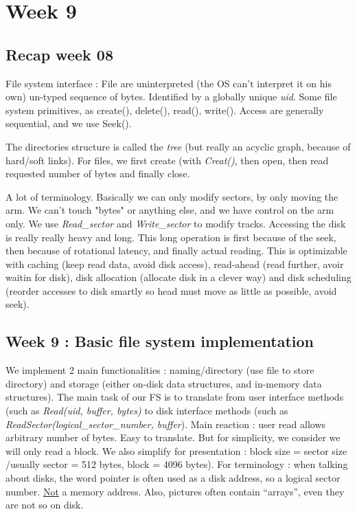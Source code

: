 \documentclass[12pt,a4paper]{article}
\begin{document}
\section{Week 9}
\subsection{Recap week 08}
File system interface : File are uninterpreted (the OS can't interpret it on his own) un-typed sequence of bytes. Identified by a globally unique \textit{uid}. Some file system primitives, as create(), delete(), read(), write(). Access are generally sequential, and we use Seek(). 

The directories structure is called the \textit{tree} (but really an acyclic graph, because of hard/soft links). For files, we first create (with \textit{Creat()}, then open, then read requested number of bytes and finally close.

A lot of terminology. Basically we can only modify sectors, by only moving the arm. We can't touch "bytes" or anything else, and we have control on the arm only. We use \textit{Read\_sector} and \textit{Write\_sector} to modify tracks. Accessing the disk is really really heavy and long. This long operation is first because of the seek, then because of rotational latency, and finally actual reading. This is optimizable with caching (keep read data, avoid disk access), read-ahead (read further, avoir waitin for disk), disk allocation (allocate disk in a clever way) and disk scheduling (reorder accesses to disk smartly so head must move as little as possible, avoid seek).

\subsection{Week 9 : Basic file system implementation}
We implement 2 main functionalities : naming/directory (use file to store directory) and storage (either on-disk data structures, and in-memory data structures). The main task of our FS is to translate from user interface methods (such as \textit{Read(uid, buffer, bytes)} to disk interface methods (such as \textit{ReadSector(logical\_sector\_number, buffer}). Main reaction : user read allows arbitrary number of bytes. Easy to translate. But for simplicity, we consider we will only read a block. We also simplify for presentation : block size = sector size /usually sector = 512 bytes, block = 4096 bytes). For terminology : when talking about disks, the word pointer is often used as a disk address, so a logical sector number. \uline{Not} a memory address. Also, pictures often contain ``arrays'', even they are not so on disk. 
\end{document}
